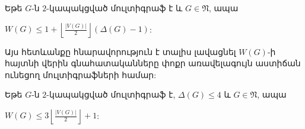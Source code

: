 \begin{corollary}
\label{c1_upper_V/2} Եթե $G$-ն $2$-կապակցված մուլտիգրաֆ է և $G\in \mathfrak{N}$, ապա
\begin{center}
$W(G)\leq 1+\left\lfloor \frac{\vert
V(G)\vert}{2}\right\rfloor(\Delta(G)-1)$:
\end{center}
\end{corollary}

Այս հետևանքը հնարավորություն է տալիս լավացնել $W(G)$-ի հայտնի վերին գնահատականները փոքր առավելագույն աստիճան ունեցող մուլտիգրաֆների համար:

\begin{corollary}
\label{c1_upper_Delta4} Եթե $G$-ն $2$-կապակցված մուլտիգրաֆ է,
$\Delta(G)\leq 4$ և $G\in \mathfrak{N}$, ապա
\begin{center}
$W(G)\leq 3\left\lfloor \frac{\vert V(G)\vert}{2}\right\rfloor+1$:
\end{center}
\end{corollary}

